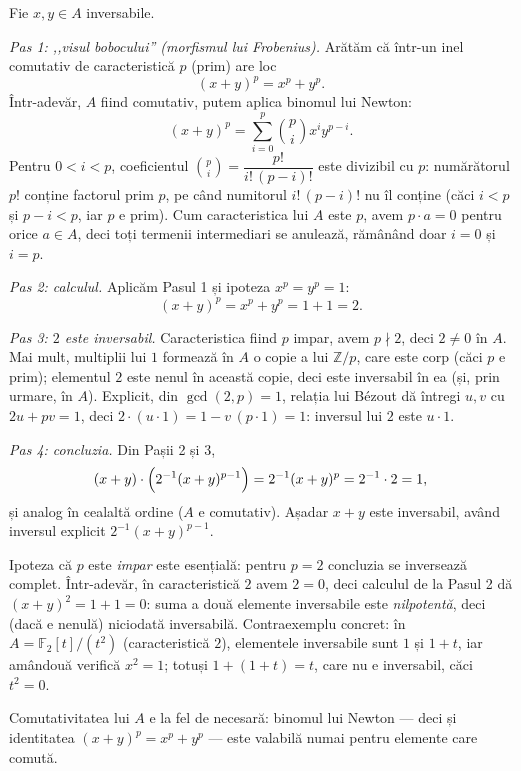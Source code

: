\begin{solutie}
Fie $x,y\in A$ inversabile.

\smallskip
\textit{Pas 1: ,,visul bobocului'' (morfismul lui Frobenius).} Arătăm
că într-un inel comutativ de caracteristică $p$ (prim) are loc
\[
  (x+y)^{p}=x^{p}+y^{p}.
\]
Într-adevăr, $A$ fiind comutativ, putem aplica binomul lui Newton:
\[
  (x+y)^{p}=\sum_{i=0}^{p}\binom{p}{i}x^{i}y^{p-i}.
\]
Pentru $0<i<p$, coeficientul $\binom{p}{i}=\dfrac{p!}{i!\,(p-i)!}$ este
divizibil cu $p$: numărătorul $p!$ conține factorul prim $p$, pe
când numitorul $i!\,(p-i)!$ nu îl conține (căci $i<p$ și
$p-i<p$, iar $p$ e prim). Cum caracteristica lui $A$ este $p$, avem
$p\cdot a=0$ pentru orice $a\in A$, deci toți termenii intermediari se
anulează, rămânând doar $i=0$ și $i=p$.

\smallskip
\textit{Pas 2: calculul.} Aplicăm Pasul 1 și ipoteza $x^{p}=y^{p}=1$:
\[
  (x+y)^{p}=x^{p}+y^{p}=1+1=2 .
\]

\smallskip
\textit{Pas 3: $2$ este inversabil.} Caracteristica fiind $p$ impar, avem
$p\nmid 2$, deci $2\neq 0$ în $A$. Mai mult, multiplii lui $1$ formează
în $A$ o copie a lui $\mathbb{Z}/p$, care este corp (căci $p$ e prim);
elementul $2$ este nenul în această copie, deci este inversabil
în ea (și, prin urmare, în $A$). Explicit, din $\gcd(2,p)=1$,
relația lui Bézout dă întregi $u,v$ cu $2u+pv=1$, deci
$2\cdot(u\cdot 1)=1-v\,(p\cdot 1)=1$: inversul lui $2$ este $u\cdot 1$.

\smallskip
\textit{Pas 4: concluzia.} Din Pașii 2 și 3,
\[
  (x+y)\cdot\Bigl(2^{-1}(x+y)^{p-1}\Bigr)=2^{-1}(x+y)^{p}=2^{-1}\cdot 2=1 ,
\]
și analog în cealaltă ordine ($A$ e comutativ). Așadar $x+y$
este inversabil, având inversul explicit $2^{-1}(x+y)^{p-1}$.
\end{solutie}

\begin{obs}
Ipoteza că $p$ este \emph{impar} este esențială: pentru $p=2$
concluzia se inversează complet. Într-adevăr, în
caracteristică $2$ avem $2=0$, deci calculul de la Pasul 2 dă
$(x+y)^{2}=1+1=0$: suma a două elemente inversabile este \emph{nilpotentă},
deci (dacă e nenulă) niciodată inversabilă. Contraexemplu
concret: în $A=\mathbb{F}_{2}[t]/(t^{2})$ (caracteristică $2$),
elementele inversabile sunt $1$ și $1+t$, iar amândouă verifică
$x^{2}=1$; totuși $1+(1+t)=t$, care nu e inversabil, căci $t^{2}=0$.

Comutativitatea lui $A$ e la fel de necesară: binomul lui Newton --- deci
și identitatea $(x+y)^{p}=x^{p}+y^{p}$ --- este valabilă numai pentru
elemente care comută.
\end{obs}

